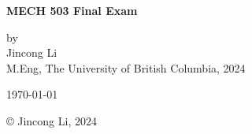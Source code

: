 \documentclass[12pt]{article} %
\begin{document}
\setlength{\parskip}{1em} 
\setlength{\parindent}{0pt}
\newcommand{\vect}[1]{\mathbf{#1}}

\begin{titlepage}  %
    \centering    %

    \vspace*{2cm}
    
    \normalsize \textbf{MECH 503 Final Exam} \\

  
    \vspace{2cm}  %
    
    \normalsize by\\
    \vspace{1cm}
    \normalsize Jincong Li \\ 
    \vspace{1cm}
    \normalsize M.Eng, The University of British Columbia, 2024
    \vspace{11cm}  %
    
    \normalsize \today

    \vfill  %
    © Jincong Li, 2024
\end{titlepage}
\tableofcontents
\newpage
\end{document}
